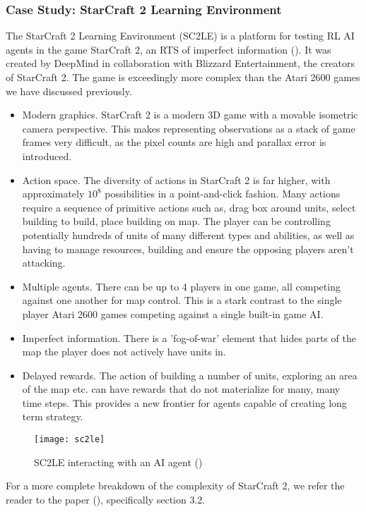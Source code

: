 \subsubsection{Case Study: StarCraft 2 Learning Environment}
The StarCraft 2 Learning Environment (SC2LE) is a platform for testing RL AI agents in the game StarCraft 2, an RTS of imperfect information (\citet{starcraft}). It was created by DeepMind in collaboration with Blizzard Entertainment, the creators of StarCraft 2. The game is exceedingly more complex than the Atari 2600 games we have discussed previously.
\begin{itemize}
    \item Modern graphics. StarCraft 2 is a modern 3D game with a movable isometric camera perspective. This makes representing observations as a stack of game frames very difficult, as the pixel counts are high and parallax error is introduced.
    \item  Action space. The diversity of actions in StarCraft 2 is far higher, with approximately $10^8$ possibilities in a point-and-click fashion. Many actions require a sequence of primitive actions such as, drag box around units, select building to build, place building on map. The player can be controlling potentially hundreds of units of many different types and abilities, as well as having to manage resources, building and ensure the opposing players aren't attacking.
    \item Multiple agents. There can be up to 4 players in one game, all competing against one another for map control. This is a stark contrast to the single player Atari 2600 games competing against a single built-in game AI.
    \item Imperfect information. There is a 'fog-of-war' element that hides parts of the map the player does not actively have units in.
    \item Delayed rewards. The action of building a number of units, exploring an area of the map etc. can have rewards that do not materialize for many, many time steps. This provides a new frontier for agents capable of creating long term strategy.
\end{itemize}

\begin{figure}[H]
    \centering
    \texttt{[image: sc2le]}
    \caption{SC2LE interacting with an AI agent (\citet{starcraft})}
\end{figure}

For a more complete breakdown of the complexity of StarCraft 2, we refer the reader to the paper (\citet{starcraft}), specifically section 3.2. \paragraph{}

